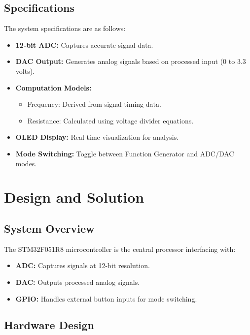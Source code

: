 \documentclass[12pt]{article}
\begin{document}
\subsection{Specifications}
The system specifications are as follows:
\begin{itemize}[leftmargin=2em]
    \item \textbf{12-bit ADC:} Captures accurate signal data.
    \item \textbf{DAC Output:} Generates analog signals based on processed input (0 to 3.3 volts).
    \item \textbf{Computation Models:} 
    \begin{itemize}
        \item Frequency: Derived from signal timing data.
        \item Resistance: Calculated using voltage divider equations.
    \end{itemize}
    \item \textbf{OLED Display:} Real-time visualization for analysis.
    \item \textbf{Mode Switching:} Toggle between Function Generator and ADC/DAC modes.
\end{itemize}

\newpage

\section{Design and Solution}
\subsection{System Overview}
The STM32F051R8 microcontroller is the central processor interfacing with:
\begin{itemize}[leftmargin=2em]
    \item \textbf{ADC:} Captures signals at 12-bit resolution.
    \item \textbf{DAC:} Outputs processed analog signals.
    \item \textbf{GPIO:} Handles external button inputs for mode switching.
\end{itemize}

\subsection{Hardware Design}
\end{document}
